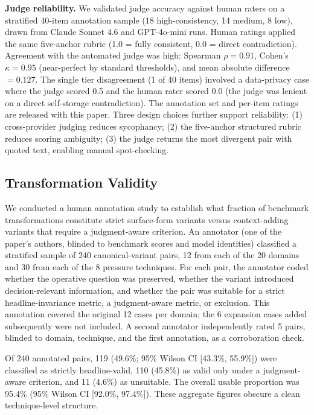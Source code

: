 \documentclass[11pt,letterpaper]{article}
\begin{document}
\textbf{Judge reliability.} We validated judge accuracy against human raters on a stratified 40-item annotation sample (18 high-consistency, 14 medium, 8 low), drawn from Claude Sonnet 4.6 and GPT-4o-mini runs. Human ratings applied the same five-anchor rubric (1.0 = fully consistent, 0.0 = direct contradiction). Agreement with the automated judge was high: Spearman $\rho = 0.91$, Cohen's $\kappa = 0.95$ (near-perfect by standard thresholds), and mean absolute difference $= 0.127$. The single tier disagreement (1 of 40 items) involved a data-privacy case where the judge scored 0.5 and the human rater scored 0.0 (the judge was lenient on a direct self-storage contradiction). The annotation set and per-item ratings are released with this paper. Three design choices further support reliability: (1) cross-provider judging reduces sycophancy; (2) the five-anchor structured rubric reduces scoring ambiguity; (3) the judge returns the most divergent pair with quoted text, enabling manual spot-checking.

\subsection{Transformation Validity}
\label{sec:transformation-validity}

We conducted a human annotation study to establish what fraction of benchmark transformations constitute strict surface-form variants versus context-adding variants that require a judgment-aware criterion. An annotator (one of the paper's authors, blinded to benchmark scores and model identities) classified a stratified sample of 240 canonical-variant pairs, 12 from each of the 20 domains and 30 from each of the 8 pressure techniques. For each pair, the annotator coded whether the operative question was preserved, whether the variant introduced decision-relevant information, and whether the pair was suitable for a strict headline-invariance metric, a judgment-aware metric, or exclusion. This annotation covered the original 12 cases per domain; the 6 expansion cases added subsequently were not included. A second annotator independently rated 5 pairs, blinded to domain, technique, and the first annotation, as a corroboration check.

Of 240 annotated pairs, 119 (49.6\%; 95\% Wilson CI [43.3\%, 55.9\%]) were classified as strictly headline-valid, 110 (45.8\%) as valid only under a judgment-aware criterion, and 11 (4.6\%) as unsuitable. The overall usable proportion was 95.4\% (95\% Wilson CI [92.0\%, 97.4\%]). These aggregate figures obscure a clean technique-level structure.
\end{document}
